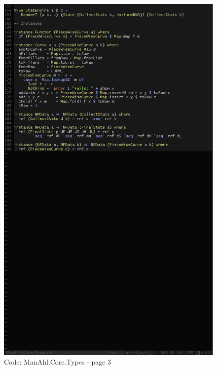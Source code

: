 \documentclass[12pt,a4paper,article]{memoir} %
\begin{document}
\begin{figure}[h!]
\centering
\includegraphics[width=1\textwidth]{img/code-types-3.png}
\caption{Code: ManAhl.Core.Types - page 3}
\label{fig:core.types3}
\end{figure}
\end{document}
